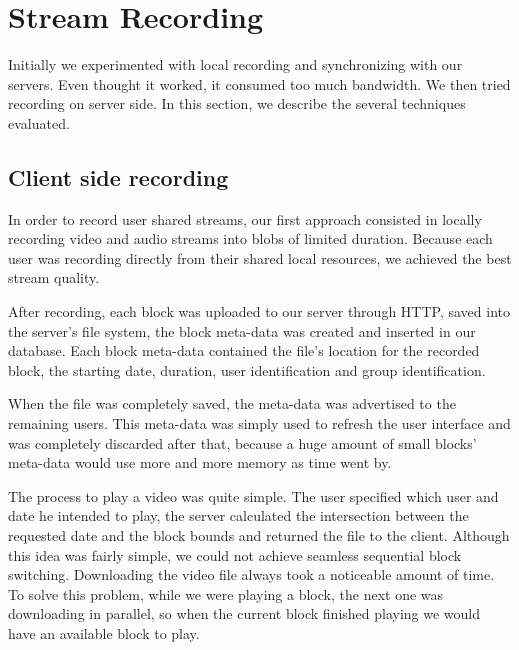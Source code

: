 \section{Stream Recording}
 Initially we experimented with local recording and synchronizing with our servers. Even thought it worked, it consumed too much bandwidth. We then tried recording on server side. In this section, we describe the several techniques evaluated.


\subsection{Client side recording}
In order to record user shared streams, our first approach consisted in locally recording video and audio streams into blobs of limited duration. Because each user was recording directly from their shared local resources, we achieved the best stream quality.

After recording, each block was uploaded to our server through \ac{HTTP}, saved into the server's file system, the block meta-data was created and inserted in our database. Each block meta-data contained the file's location for the recorded block, the starting date, duration, user identification and group identification.



When the file was completely saved, the meta-data was advertised to the remaining users. This meta-data was simply used to refresh the user interface and was completely discarded after that, because a huge amount of small blocks' meta-data would use more and more memory as time went by. 


	The process to play a video was quite simple. The user specified which user and date he intended to play, the server calculated the intersection between the requested date and the block bounds and returned the file to the client.
	Although this idea was fairly simple, we could not achieve seamless sequential block switching. Downloading the video file always took a noticeable amount of time. To solve this problem, while we were playing a block, the next one was downloading in parallel, so when the current block finished playing we would have an available block to play. 

